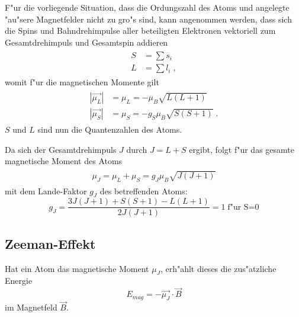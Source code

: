     F"ur die vorliegende Situation, dass die Ordungszahl des Atoms und angelegte "au"sere Magnetfelder nicht zu gro"s sind, kann angenommen werden, dass sich die Spins und Bahndrehimpulse aller beteiligten Elektronen vektoriell zum Gesamtdrehimpuls und Gesamtspin addieren
    \begin{align}
      \begin{split}
        S &= \sum s_i\\
        L &= \sum l_i \; ,
      \end{split}
    \end{align}
    womit f"ur die magnetischen Momente gilt
    \begin{align}
      \begin{split}
        |\vec{\mu_L}| &= \mu_L = -\mu_B\sqrt{L(L+1)} \\
        |\vec{\mu_S}| &= \mu_S = -g_S\mu_B\sqrt{S(S+1)} \; .
      \end{split}
    \end{align}
    $S$ und $L$ sind nun die Quantenzahlen des Atoms.

    Da sich der Gesamtdrehimpuls $J$ durch $J=L+S$ ergibt, folgt f"ur das gesamte magnetische Moment des Atoms
    \begin{align}
      \begin{split}
        \mu_J = \mu_L + \mu_S = g_J \mu_B \sqrt{J(J+1)}
      \end{split}
    \end{align}
    mit dem Lande-Faktor $g_J$ des betreffenden Atoms:
    \begin{equation}
      g_J = \frac{3J(J+1) + S(S+1) - L(L+1)}{2J(J+1)} = 1 \; \text{f"ur S=0}
      \label{g_J}
    \end{equation}


  \subsection{Zeeman-Effekt}
    Hat ein Atom das magnetische Moment $\mu_J$, erh"ahlt dieses die zus"atzliche Energie
    \begin{equation}
      E_{mag} = -\vec{\mu_J} \cdot \vec{B}
    \end{equation}
    im Magnetfeld $\vec{B}$.

